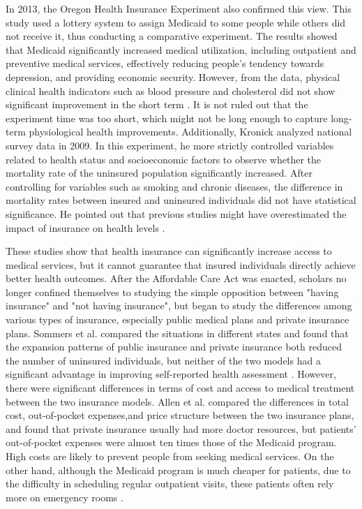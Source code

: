 In 2013, the Oregon Health Insurance Experiment also confirmed this view. This study used a lottery system to assign Medicaid to some people while others did not receive it, thus conducting a comparative experiment. The results showed that Medicaid significantly increased medical utilization, including outpatient and preventive medical services, effectively reducing people's tendency towards depression, and providing economic security. However, from the data, physical clinical health indicators such as blood pressure and cholesterol did not show significant improvement in the short term \cite{doi:10.1056/NEJMsa1212321}. It is not ruled out that the experiment time was too short, which might not be long enough to capture long-term physiological health improvements. Additionally, Kronick analyzed national survey data in 2009. In this experiment, he more strictly controlled variables related to health status and socioeconomic factors to observe whether the mortality rate of the uninsured population significantly increased. After controlling for variables such as smoking and chronic diseases, the difference in mortality rates between insured and uninsured individuals did not have statistical significance. He pointed out that previous studies might have overestimated the impact of insurance on health levels \cite{Kronick_2009}.

These studies show that health insurance can significantly increase access to medical services, but it cannot guarantee that insured individuals directly achieve better health outcomes. After the Affordable Care Act was enacted, scholars no longer confined themselves to studying the simple opposition between "having insurance" and "not having insurance", but began to study the differences among various types of insurance, especially public medical plans and private insurance plans. Sommers et al. compared the situations in different states and found that the expansion patterns of public insurance and private insurance both reduced the number of uninsured individuals, but neither of the two models had a significant advantage in improving self-reported health assessment \cite{Sommers_Blendon_Orav_Epstein_2016}. However, there were significant differences in terms of cost and access to medical treatment between the two insurance models. Allen et al. compared the differences in total cost, out-of-pocket expenses,and price structure between the two insurance plans, and found that private insurance usually had more doctor resources, but patients' out-of-pocket expenses were almost ten times those of the Medicaid program. High costs are likely to prevent people from seeking medical services. On the other hand, although the Medicaid program is much cheaper for patients, due to the difficulty in scheduling regular outpatient visits, these patients often rely more on emergency rooms \cite{Allen_Gordon_Lee_Bhanja_Sommers_2021}.

